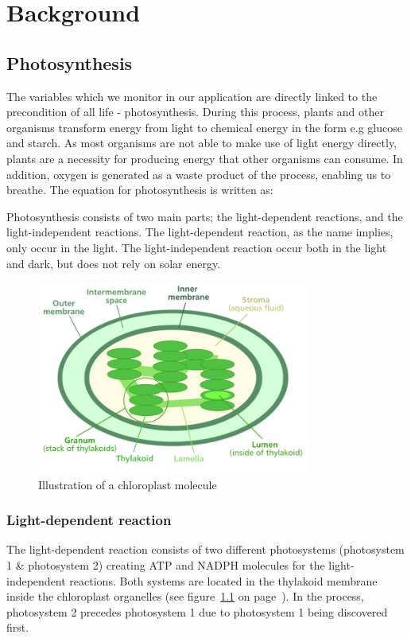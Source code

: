 \chapter{Background}

\section{Photosynthesis}
The variables which we monitor in our application are directly linked to the precondition of all life - photosynthesis. During this process, plants and other organisms transform energy from light to chemical energy in the form e.g glucose and starch. As most organisms are not able to make use of light energy directly, plants are a necessity for producing energy that other organisms can consume. In addition, oxygen is generated as a waste product of the process, enabling us to breathe. The equation for photosynthesis is written as: 

Photosynthesis consists of two main parts; the light-dependent reactions, and the light-independent reactions. The light-dependent reaction, as the name implies, only occur in the light. The light-independent reaction occur both in the light and dark, but does not rely on solar energy.  

\begin{figure}
\centering
\includegraphics[width=0.8\textwidth]{img/photosynthesis/Chloroplast_diagram.png}
\caption{Illustration of a chloroplast molecule \citep{wiki:chloroplast}}
\label{fig:chloroplast}
\end{figure}

\subsection{Light-dependent reaction}
The light-dependent reaction consists of two different photosystems (photosystem 1 \& photosystem 2) creating ATP and NADPH molecules for the light-independent reactions. Both systems are located in the thylakoid membrane inside the chloroplast organelles (see figure~\ref{fig:chloroplast} on page~\pageref{fig:chloroplast}).  In the process, photosystem 2 precedes photosystem 1 due to photosystem 1 being discovered first. 

